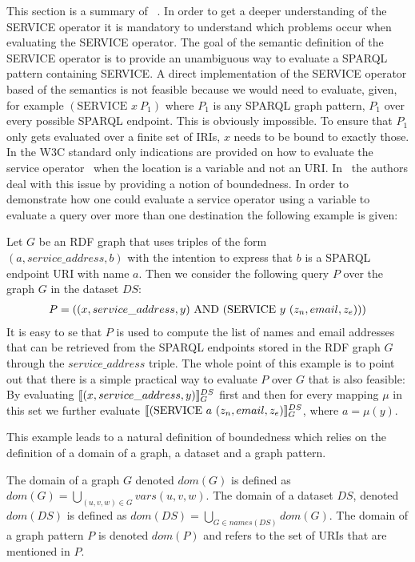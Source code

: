 This section is a summary of ~\cite[p. 4-7]{BuilAranda20131}. In order to get a
deeper understanding of the SERVICE operator it is mandatory to understand which
problems occur when evaluating the SERVICE operator.
The goal of the semantic definition of the SERVICE operator is to provide an
unambiguous way to evaluate a SPARQL pattern containing SERVICE. A direct
implementation of the SERVICE operator based of the semantics is not feasible 
because we would need to evaluate, given, for example $(\mbox{SERVICE }  x \
P_1)$ where $P_1$ is any SPARQL graph pattern, $P_1$ over every 
possible SPARQL endpoint. This is obviously impossible. To ensure that $P_1$
only gets evaluated over a finite set of IRIs, $x$ needs to be bound to exactly
those. In the W3C standard only indications are provided on how to evaluate the
service operator~\cite{w3standardservice} when the location is a variable and
not an URI. In~\cite{BuilAranda20131} the authors deal with this issue by
providing a notion of boundedness. In order to demonstrate how one could
evaluate a service operator using a variable to evaluate a query over more than
one destination the following example is given:
\begin{example}
Let $G$ be an RDF graph that uses triples of the form\\ $(a, service\_address,b)$
with the intention to express that $b$ is a SPARQL endpoint URI with name $a$.
Then we consider the following query $P$ over the graph $G$ in the dataset $DS$:
\begin{align*}
	P=((x, service\_address, y) \AND (\mbox{SERVICE } y \ (z_n,email,z_e)))
\end{align*}
It is easy to se that $P$ is used to compute the list of names and email
addresses that can be retrieved from the SPARQL endpoints stored in the RDF
graph $G$ through the $service\_address$ triple. 
The whole point of this example is to point out that there is a simple practical
way to evaluate $P$ over $G$ that is also feasible:
By evaluating $\llbracket (x,service\_address,y) \rrbracket^{DS}_G$ first and then for every
mapping $\mu$ in this set we further evaluate $\llbracket (\mbox{SERVICE } a \ (z_n, email, z_e)
\rrbracket^{DS}_G$, where $a = \mu(y)$. 
\end{example}

\noindent This example leads to a natural definition of boundedness which relies
on the definition of a domain of a graph, a dataset and a graph pattern.

\begin{definition}[Domain of a graph, a dataset and a graph pattern,\cite{BuilAranda20131}]
    The domain of a graph $G$ denoted $dom(G)$ is defined as $dom(G) = \bigcup\limits_{(u,v,w) \in G}
    vars(u,v,w)$. The domain of a dataset $DS$, denoted $dom(DS)$ is defined as
    $dom(DS) = \bigcup\limits_{G \in names(DS)} dom(G)$.
    The domain of a graph pattern $P$ is denoted $dom(P)$ and refers to the set of URIs that are
mentioned in $P$.
\end{definition}

